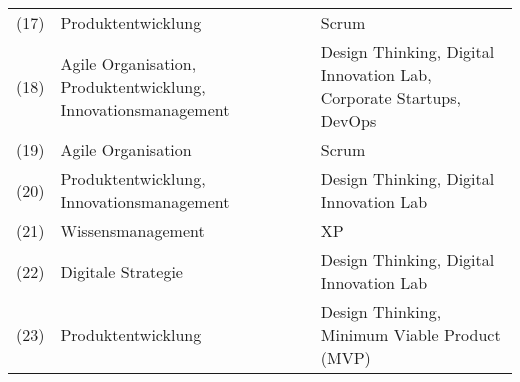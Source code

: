 \begin{sidewaystable}[ht]
\begin{tabular}{|l|p{10cm}|p{10cm}|}
		(17)                              & Produktentwicklung                                                                                                 & Scrum                                                                                            \\
		(18)                               & Agile Organisation, Produktentwicklung, Innovationsmanagement                                                      & Design Thinking, Digital Innovation Lab, Corporate Startups, DevOps                              \\
		(19)                                  & Agile Organisation                                                                                                 & Scrum                                                                                            \\
		(20)             & Produktentwicklung, Innovationsmanagement                                                                          & Design Thinking, Digital Innovation Lab                                                          \\
		(21)        & Wissensmanagement                                                                                                  & XP                                                                                               \\
		(22)                  & Digitale Strategie                                                                                                 & Design Thinking, Digital Innovation Lab                                                          \\
		(23)                  & Produktentwicklung                                                                                                 & Design Thinking, Minimum Viable Product (MVP)                                                  \\
		\hline
	\end{tabular}
	\label{tab:clusteringslr2}
\end{sidewaystable}

